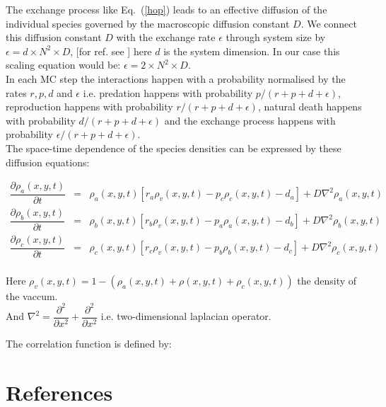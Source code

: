 \documentclass[aps, prl, twocolumn, amsmath, superscriptaddress,showkeys,showpacs]{revtex4-2}
\begin{document}


The exchange process like Eq.~(\ref{hop}) leads to an effective diffusion of the individual species governed by the macroscopic diffusion constant $D$. We connect this diffusion constant $D$ with the exchange rate $\epsilon$ through system size by $\epsilon=d\times N^2 \times D $, [for ref. see \citep{reichenbach2007noise}] here $d$ is the system dimension. In our case this scaling equation would be: $\epsilon=2 \times N^2 \times D $. \\
In each MC step the interactions happen with a probability normalised by the rates $r,p,d$ and $ \epsilon$ i.e. predation happens with probability $p/(r+p+d+\epsilon)$, reproduction happens with probability $r/(r+p+d+\epsilon)$, natural death happens with probability $d/(r+p+d+\epsilon)$ and the exchange process happens with probability $\epsilon/(r+p+d+\epsilon)$.\\
The space-time dependence of the species densities can be expressed by these diffusion equations:

\begin{eqnarray}
	\dfrac{\partial \rho_a(x,y,t)}{\partial t} &=& \rho_a(x,y,t)[r_a \rho_v(x,y,t) - p_c\rho_c(x,y,t) - d_a]+D \nabla^2 \rho_a(x,y,t) \nonumber\\[0.2cm]
	\dfrac{\partial \rho_b(x,y,t)}{\partial t} &=& \rho_b(x,y,t)[r_b \rho_v(x,y,t) - p_a\rho_a(x,y,t) - d_b]+D \nabla^2 \rho_b(x,y,t) \nonumber\\[0.2cm]
	\dfrac{\partial \rho_c(x,y,t)}{\partial t} &=& \rho_c(x,y,t)[r_c \rho_v(x,y,t) - p_b\rho_b(x,y,t) - d_c]+D \nabla^2 \rho_c(x,y,t) \\[0.2cm]
\label{rateeqn}
\end{eqnarray}

Here $\rho_v(x,y,t)=1-(\rho_a(x,y,t)+\rho(x,y,t)+\rho_c(x,y,t))$ the density of the vaccum.\\[0.2cm]
 And $\nabla^2 =\dfrac{\partial^2}{\partial x^2} + \dfrac{\partial^2}{\partial x^2} $ i.e. two-dimensional laplacian operator. 

The correlation function is defined by:





\section{References}



	
\end{document}

